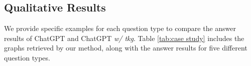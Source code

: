 \documentclass[11pt]{article}
\begin{document}
    




\subsection{Qualitative Results} \label{sec:qualitative}

We provide specific examples for each question type to compare the answer results of ChatGPT and ChatGPT \textit{w/ tkg}.
Table \ref{tab:case study} includes the graphs retrieved by our method, along with the answer results for five different question types.
\end{document}
